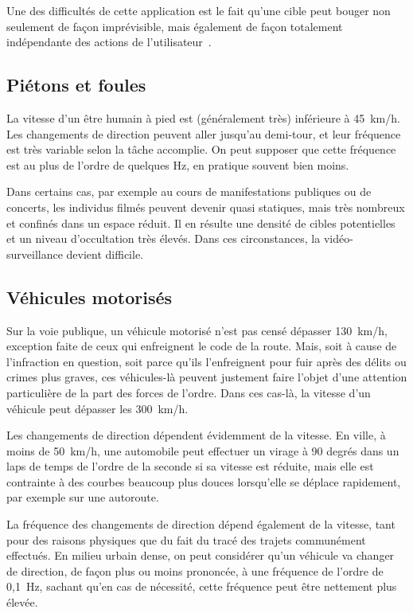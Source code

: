 	Une des difficultés de cette application est le fait qu'une cible peut bouger non seulement de façon imprévisible, mais également de façon totalement indépendante des actions de l'utilisateur~\cite{ilich2010moving, silva2012real}.	
	
	\FloatBarrier \subsection{Piétons et foules}
	La vitesse d'un être humain à pied est (généralement très) inférieure à 45~km/h. Les changements de direction peuvent aller jusqu'au demi-tour, et leur fréquence est très variable selon la tâche accomplie. On peut supposer que cette fréquence est au plus de l'ordre de quelques Hz, en pratique souvent bien moins.
	
	Dans certains cas, par exemple au cours de manifestations publiques ou de concerts, les individus filmés peuvent devenir quasi statiques, mais très nombreux et confinés dans un espace réduit. Il en résulte une densité de cibles potentielles et un niveau d'occultation très élevés. Dans ces circonstances, la vidéo-surveillance devient difficile.

	\FloatBarrier \subsection{Véhicules motorisés}
	Sur la voie publique, un véhicule motorisé n'est pas censé dépasser 130~km/h, exception faite de ceux qui enfreignent le code de la route. Mais, soit à cause de l'infraction en question, soit parce qu'ils l'enfreignent pour fuir après des délits ou crimes plus graves, ces véhicules-là peuvent justement faire l'objet d'une attention particulière de la part des forces de l'ordre. Dans ces cas-là, la vitesse d'un véhicule peut dépasser les 300~km/h\footnotemark.
	
	
	Les changements de direction dépendent évidemment de la vitesse. En ville, à moins de 50~km/h, une automobile peut effectuer un virage à 90 degrés dans un laps de temps de l'ordre de la seconde si sa vitesse est réduite, mais elle est contrainte à des courbes beaucoup plus douces lorsqu'elle se déplace rapidement, par exemple sur une autoroute.
	
	La fréquence des changements de direction dépend également de la vitesse, tant pour des raisons physiques que du fait du tracé des trajets communément effectués. En milieu urbain dense, on peut considérer qu'un véhicule va changer de direction, de façon plus ou moins prononcée, à une fréquence de l'ordre de 0,1~Hz, sachant qu'en cas de nécessité, cette fréquence peut être nettement plus élevée.
	
